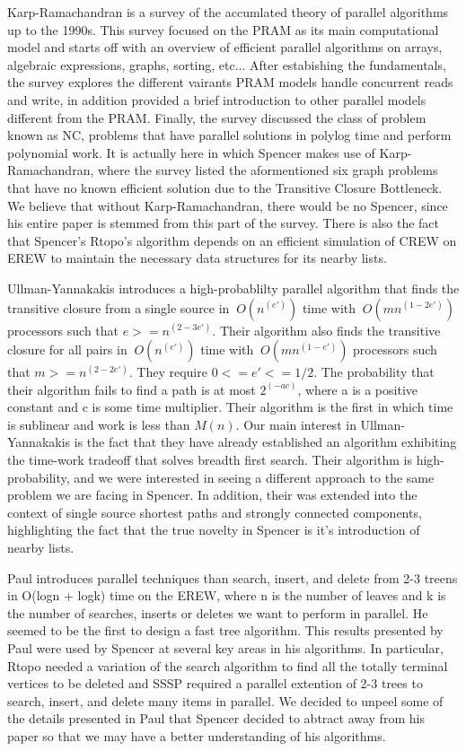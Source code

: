 \documentclass[paper=a4, fontsize=11pt]{scrartcl} %
\numberwithin{equation}{section} %
\numberwithin{figure}{section} %
\numberwithin{table}{section} %
\begin{document}
Karp-Ramachandran is a survey of the accumlated theory of parallel algorithms up to the 1990s. This survey focused on the PRAM as its main computational model and starts off with an overview of efficient parallel algorithms on arrays, algebraic expressions, graphs, sorting, etc... After estabishing the fundamentals, the survey explores the different vairants PRAM models handle concurrent reads and write, in addition provided a brief introduction to other parallel models different from the PRAM. Finally, the survey discussed the class of problem known as NC, problems that have parallel solutions in polylog time and perform polynomial work.  It is actually here in which Spencer makes use of Karp-Ramachandran, where the survey listed the aformentioned six graph problems that have no known efficient solution due to the Transitive Closure Bottleneck. We believe that without Karp-Ramachandran, there would be no Spencer, since his entire paper is stemmed from this part of the survey. There is also the fact that Spencer's Rtopo's algorithm depends on an efficient simulation of CREW on EREW to maintain the necessary data structures for its nearby lists.

Ullman-Yannakakis introduces a high-probablilty parallel algorithm that finds the transitive closure from a single source in $~O(n^(e'))$ time with $~O(mn^(1-2e'))$ processors such that $e >= n^(2-3e')$. Their algorithm also finds the transitive closure for all pairs in $~O(n^(e'))$ time with $~O(mn^(1-e'))$ processors such that $m >= n^(2-2e')$. They require $0 <= e' <= 1/2$. The probability that their algorithm fails to find a path is at most $2^(-ac)$, where a is a positive constant and c is some time multiplier. Their algorithm is the first in which time is sublinear and work is less than $M(n)$. Our main interest in Ullman-Yannakakis is the fact that they have already established an algorithm exhibiting the time-work tradeoff that solves breadth first search. Their algorithm is high-probability, and we were interested in seeing a different approach to the same problem we are facing in Spencer. In addition, their was extended into the context of single source shortest paths and strongly connected components, highlighting the fact that the true novelty in Spencer is it's introduction of nearby lists.

Paul introduces parallel techniques than search, insert, and delete from 2-3 treens in O(logn + logk) time on the EREW, where n is the number of leaves and k is the number of searches, inserts or deletes we want to perform in parallel. He seemed to be the first to design a fast tree algorithm. This results presented by Paul were used by Spencer at several key areas in his algorithms. In particular, Rtopo needed a variation of the search algorithm to find all the totally terminal vertices to be deleted and SSSP required a parallel extention of 2-3 trees to search, insert, and delete many items in parallel. We decided to unpeel some of the details presented in Paul that Spencer decided to abtract away from his paper so that we may have a better understanding of his algorithms.
\end{document}
